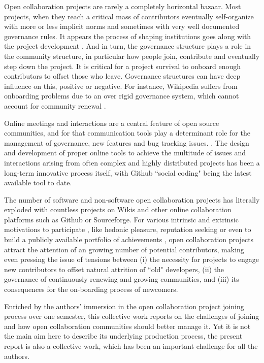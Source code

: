 Open collaboration projects are rarely a completely horizontal bazaar. Most projects, when they reach a critical mass of contributors eventually self-organize with more or less implicit norms and sometimes with very well documented governance rules. It appears the process of shaping institutions goes along with the project development \cite{O'Mahony2007}. And in turn, the governance structure plays a role in the community structure, in particular how people join, contribute and eventually step down the project. It is critical for a project survival to onboard enough contributors to offset those who leave. Governance structures can have deep influence on this, positive or negative. For instance, Wikipedia suffers from onboarding problems due to an over rigid governance system, which cannot account for community renewal \cite{halfaker2013}.

Online meetings and interactions are a central feature of open source communities, and for that communication tools play a determinant role \cite{kuk2006strategic} for the management of governance, new features and bug tracking issues. \cite{lomi2013}. The design and development of proper online tools to achieve the multitude of issues and interactions arising from often complex and highly distributed projects has been a long-term innovative process itself, with Github ``social coding" being the latest available tool to date.

The number of software and non-software open collaboration projects has literally exploded with countless projects on Wikis and other online collaboration platforms such as Github or Sourceforge. For various intrinsic and extrinsic motivations to participate , like hedonic pleasure, reputation seeking or even to build a publicly available portfolio of achievements \cite{hars2001} , open collaboration projects attract the attention of an growing number of potential contributors, making even pressing the issue of tensions between (i) the necessity for projects to engage new contributors to offset natural attrition of ``old" developers, (ii)  the governance of continuously  renewing and growing communities, and (iii) its consequences for the on-boarding process of newcomers.

Enriched by the authors' immersion in the open collaboration project joining process over one semester, this collective work reports on the challenges of joining and how open collaboration communities should better manage it. Yet it is not the main aim here to describe its underlying production process,  the present report is also a collective work, which has been an important challenge for all the authors.  

